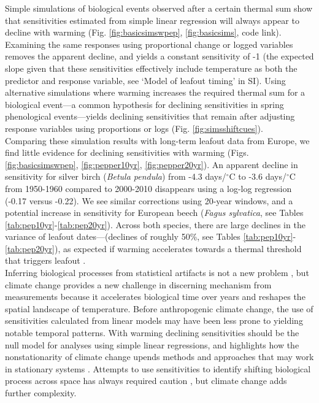 \documentclass[11pt,letter]{article}
\begin{document}
Simple simulations of biological events observed after a certain thermal sum show that sensitivities estimated from simple linear regression will always appear to decline with warming (Fig. \ref{fig:basicsimswpep}, \ref{fig:basicsims}, code link). Examining the same responses using proportional change or logged variables removes the apparent decline, and yields a constant sensitivity of -1 (the expected slope given that these sensitivities effectively include temperature as both the predictor and response variable, see `Model of leafout timing' in SI). Using alternative simulations where warming increases the required thermal sum for a biological event---a common hypothesis for declining sensitivities in spring phenological events---yields declining sensitivities that remain after adjusting response variables using proportions or logs (Fig. \ref{fig:simsshiftcues}). \\

Comparing these simulation results with long-term leafout data from Europe, we find little evidence for declining sensitivities with warming (Figs. \ref{fig:basicsimswpep}, \ref{fig:pepper10yr}, \ref{fig:pepper20yr}). An apparent decline in sensitivity for silver birch (\emph{Betula pendula}) from -4.3 days/$^{\circ}$C to -3.6 days/$^{\circ}$C from 1950-1960 compared to 2000-2010 disappears using a log-log regression (-0.17 versus -0.22). We see similar corrections using 20-year windows, and a potential increase in sensitivity for European beech (\emph{Fagus sylvatica}, see Tables \ref{tab:pep10yr}-\ref{tab:pep20yr}). Across both species, there are large declines in the variance of leafout dates---(declines of roughly 50\%, see Tables \ref{tab:pep10yr}-\ref{tab:pep20yr}), as expected if warming accelerates towards a thermal threshold that triggers leafout \citep[and in contrast to predictions from shifting biology, see][]{ford2016}. \\

Inferring biological processes from statistical artifacts is not a new problem \citep[e.g.,][]{nee2005}, but climate change provides a new challenge in discerning mechanism from measurements because it accelerates biological time over years and reshapes the spatial landscape of temperature. Before anthropogenic climate change, the use of sensitivities calculated from linear models may have been less prone to yielding notable temporal patterns. With warming declining sensitivities should be the null model for analyses using simple linear regressions, and highlights how the nonstationarity of climate change upends methods and approaches that may work in stationary systems \citep{Milly:2008yu,tempeco}.  Attempts to use sensitivities to identify shifting biological process across space has always required caution \citep[e.g.,][]{tansey2017}, but climate change adds further complexity. \\ %
\end{document}
